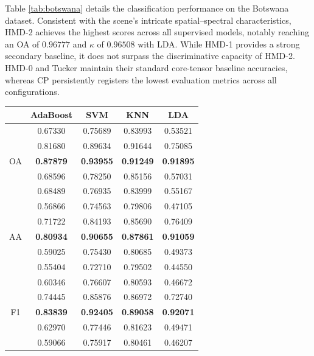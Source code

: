 \documentclass[12pt,onecolumn]{article}
\begin{document}

Table \ref{tab:botswana} details the classification performance on the Botswana dataset. Consistent with the scene's intricate spatial–spectral characteristics, HMD-2 achieves the highest scores across all supervised models, notably reaching an OA of $0.96777$ and $\kappa$ of $0.96508$ with LDA. While HMD-1 provides a strong secondary baseline, it does not surpass the discriminative capacity of HMD-2. HMD-0 and Tucker maintain their standard core-tensor baseline accuracies, whereas CP persistently registers the lowest evaluation metrics across all configurations.

\begin{table}[h!]
\centering
\begin{tabular}{ccccc}
     \hline
     & AdaBoost & SVM & KNN & LDA \\
     \hline
     \multirow{5}{*}{OA}
     & 0.67330 & 0.75689 & 0.83993 & 0.53521 \\
     & 0.81680 & 0.89634 & 0.91644 & 0.75085 \\
     & \textbf{0.87879} & \textbf{0.93955} & \textbf{0.91249} & \textbf{0.91895} \\
     & 0.68596 & 0.78250 & 0.85156 & 0.57031 \\
     & 0.68489 & 0.76935 & 0.83999 & 0.55167 \\
	 
	 \hline     
	 \multirow{5}{*}{AA}
     & 0.56866 & 0.74563 & 0.79806 & 0.47105 \\
     & 0.71722 & 0.84193 & 0.85690 & 0.76409 \\
     & \textbf{0.80934} & \textbf{0.90655} & \textbf{0.87861} & \textbf{0.91059} \\
     & 0.59025 & 0.75430 & 0.80685 & 0.49373 \\
     & 0.55404 & 0.72710 & 0.79502 & 0.44550 \\

	 \hline     
	 \multirow{5}{*}{F1}
     & 0.60346 & 0.76607 & 0.80593 & 0.46672 \\
     & 0.74445 & 0.85876 & 0.86972 & 0.72740 \\
     & \textbf{0.83839} & \textbf{0.92405} & \textbf{0.89058} & \textbf{0.92071} \\
     & 0.62970 & 0.77446 & 0.81623 & 0.49471 \\
     & 0.59066 & 0.75917 & 0.80461 & 0.46207 \\


\end{tabular}
\end{table}
\end{document}
